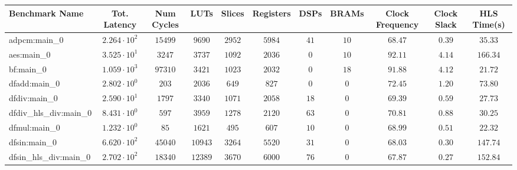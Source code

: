 \begin{tabular}{|l|c|c|c|c|c|c|c|c|c|c|}
\hline
Benchmark Name          & Tot. Latency           & Num Cycles & LUTs      & Slices    & Registers & DSPs    & BRAMs   & Clock Frequency & Clock Slack & HLS Time(s) \\
\hline
adpcm:main\_0           & $ 2.264 \cdot 10^{2} $ & $ 15499  $ & $ 9690  $ & $ 2952  $ & $ 5984  $ & $ 41  $ & $ 10  $ & $ 68.47       $ & $ 0.39    $ & $ 35.33   $ \\
aes:main\_0             & $ 3.525 \cdot 10^{1} $ & $ 3247   $ & $ 3737  $ & $ 1092  $ & $ 2036  $ & $ 0   $ & $ 10  $ & $ 92.11       $ & $ 4.14    $ & $ 166.34  $ \\
bf:main\_0              & $ 1.059 \cdot 10^{3} $ & $ 97310  $ & $ 3421  $ & $ 1023  $ & $ 2032  $ & $ 0   $ & $ 18  $ & $ 91.88       $ & $ 4.12    $ & $ 21.72   $ \\
dfadd:main\_0           & $ 2.802 \cdot 10^{0} $ & $ 203    $ & $ 2036  $ & $ 649   $ & $ 827   $ & $ 0   $ & $ 0   $ & $ 72.45       $ & $ 1.20    $ & $ 73.80   $ \\
dfdiv:main\_0           & $ 2.590 \cdot 10^{1} $ & $ 1797   $ & $ 3340  $ & $ 1071  $ & $ 2058  $ & $ 18  $ & $ 0   $ & $ 69.39       $ & $ 0.59    $ & $ 27.73   $ \\
dfdiv\_hls\_div:main\_0 & $ 8.431 \cdot 10^{0} $ & $ 597    $ & $ 3959  $ & $ 1278  $ & $ 2120  $ & $ 63  $ & $ 0   $ & $ 70.81       $ & $ 0.88    $ & $ 30.25   $ \\
dfmul:main\_0           & $ 1.232 \cdot 10^{0} $ & $ 85     $ & $ 1621  $ & $ 495   $ & $ 607   $ & $ 10  $ & $ 0   $ & $ 68.99       $ & $ 0.51    $ & $ 22.32   $ \\
dfsin:main\_0           & $ 6.620 \cdot 10^{2} $ & $ 45040  $ & $ 10943 $ & $ 3264  $ & $ 5520  $ & $ 31  $ & $ 0   $ & $ 68.03       $ & $ 0.30    $ & $ 147.74  $ \\
dfsin\_hls\_div:main\_0 & $ 2.702 \cdot 10^{2} $ & $ 18340  $ & $ 12389 $ & $ 3670  $ & $ 6000  $ & $ 76  $ & $ 0   $ & $ 67.87       $ & $ 0.27    $ & $ 152.84  $ \\

\end{tabular}
